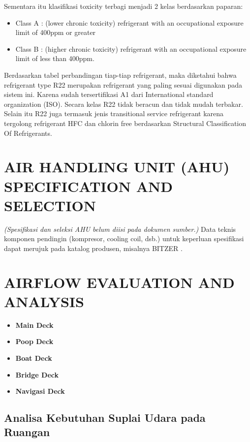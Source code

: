 \documentclass[12pt,a4paper,twoside,openright]{book}
\theoremstyle{definition}
\theoremstyle{plain}
\theoremstyle{remark}
\begin{document}
Sementara itu klasifikasi toxicity terbagi menjadi 2 kelas berdasarkan paparan:

\begin{itemize}
  \item Class A : (lower chronic toxicity) refrigerant with an occupational exposure limit of 400ppm or greater
  \item Class B : (higher chronic toxicity) refrigerant with an occupational exposure limit of less than 400ppm.
\end{itemize}

Berdasarkan tabel perbandingan tiap-tiap refrigerant, maka diketahui bahwa refrigerant type R22 merupakan refrigerant yang paling sesuai digunakan pada sistem ini. Karena sudah tersertifikasi A1 dari International standard organization (ISO). Secara kelas R22 tidak beracun dan tidak mudah terbakar. Selain itu R22 juga termasuk jenis transitional service refrigerant karena tergolong refrigerant HFC dan chlorin free berdasarkan Structural Classification Of Refrigerants.

\section{AIR HANDLING UNIT (AHU) SPECIFICATION AND SELECTION}

\textit{(Spesifikasi dan seleksi AHU belum diisi pada dokumen sumber.)} Data teknis komponen pendingin (kompresor, cooling coil, dsb.) untuk keperluan spesifikasi dapat merujuk pada katalog produsen, misalnya BITZER \citep{bitzer2022}.

\section{AIRFLOW EVALUATION AND ANALYSIS}

\begin{itemize}
  \item \textbf{Main Deck}
  \item \textbf{Poop Deck}
  \item \textbf{Boat Deck}
  \item \textbf{Bridge Deck}
  \item \textbf{Navigasi Deck}
\end{itemize}

\subsection{Analisa Kebutuhan Suplai Udara pada Ruangan}
\end{document}
